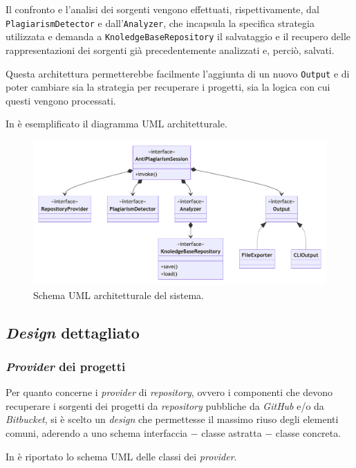 Il confronto e l'analisi dei sorgenti vengono effettuati, rispettivamente, dal \texttt{PlagiarismDetector} e dall'\texttt{Analyzer}, che incapsula la specifica strategia utilizzata e demanda a \texttt{KnoledgeBaseRepository} il salvataggio e il recupero delle rappresentazioni dei sorgenti già precedentemente analizzati e, perciò, salvati.

Questa architettura permetterebbe facilmente l'aggiunta di un nuovo \texttt{Output} e di poter cambiare sia la strategia per recuperare i progetti, sia la logica con cui questi vengono processati.

In  è esemplificato il diagramma UML architetturale.

\begin{figure}[h!]
    \centering
    \includegraphics[width=\textwidth]{resources/img/02-achitecture.pdf}
    \caption{Schema UML architetturale del sistema.}
    \label{img:02-architecture}
\end{figure}
%
%

\subsection{\textit{Design} dettagliato}

\subsubsection*{\textit{Provider} dei progetti}
Per quanto concerne i \textit{provider} di \textit{repository}, ovvero i componenti che devono recuperare i sorgenti dei progetti da \textit{repository} pubbliche da \textit{GitHub} e/o da \textit{Bitbucket}, si è scelto un \textit{design} che permettesse il massimo riuso degli elementi comuni, aderendo a uno schema interfaccia $-$ classe astratta $-$ classe concreta.

In  è riportato lo schema UML delle classi dei \textit{provider}.

